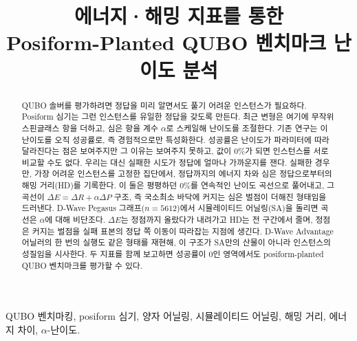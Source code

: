 \documentclass[10pt, conference]{IEEEtran}
\begin{document}
\title{에너지·해밍 지표를 통한\\
Posiform-Planted QUBO 벤치마크 난이도 분석}

\author{
\and
{}
}

\maketitle

\begin{abstract}
QUBO 솔버를 평가하려면 정답을 미리 알면서도 풀기 어려운 인스턴스가 필요하다.
Posiform 심기는 그런 인스턴스를 유일한 정답을 갖도록 만든다. 최근 변형은 여기에
무작위 스핀글래스 항을 더하고, 심은 항을 계수 $\alpha$로 스케일해 난이도를
조절한다. 기존 연구는 이 난이도를 오직 성공률로, 즉 경험적으로만 특성화한다.
성공률은 난이도가 파라미터에 따라 달라진다는 점은 보여주지만 그 이유는 보여주지
못하고, 값이 $0\%$가 되면 인스턴스를 서로 비교할 수도 없다. 우리는 대신 실패한
시도가 정답에 얼마나 가까운지를 잰다. 실패한 경우만, 가장 어려운 인스턴스를
고정한 집단에서, 정답까지의 에너지 차와 심은 정답으로부터의 해밍 거리(HD)를
기록한다. 이 둘은 평평하던 $0\%$를 연속적인 난이도 곡선으로 풀어내고, 그 곡선이
$\Delta E = \Delta R + \alpha\Delta P$ 구조, 즉 국소최소 바닥에 커지는 심은 벌점이
더해진 형태임을 드러낸다. D-Wave Pegasus 그래프($n{=}5612$)에서 시뮬레이티드
어닐링(SA)을 돌리면 곡선은 $\alpha$에 대해 비단조다. $\Delta E$는 정점까지 올랐다가
내려가고 HD는 전 구간에서 줄며, 정점은 커지는 벌점을 실패 표본의 정답 쪽 이동이
따라잡는 지점에 생긴다. D-Wave Advantage 어닐러의 한 번의 실행도 같은 형태를
재현해, 이 구조가 SA만의 산물이 아니라 인스턴스의 성질임을 시사한다. 두 지표를 함께 보고하면 성공률이 $0$인 영역에서도
posiform-planted QUBO 벤치마크를 평가할 수 있다.
\end{abstract}

\begin{IEEEkeywords}
QUBO 벤치마킹, posiform 심기, 양자 어닐링, 시뮬레이티드 어닐링,
해밍 거리, 에너지 차이, $\alpha$-난이도.
\end{IEEEkeywords}
\end{document}
